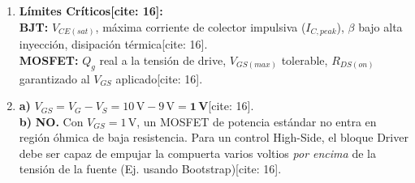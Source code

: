 \documentclass[11pt, a4paper]{article}
\begin{document}
\begin{enumerate}
    \item \textbf{Límites Críticos[cite: 16]:} \\
    \textbf{BJT:} $V_{CE(sat)}$, máxima corriente de colector impulsiva ($I_{C,peak}$), $\beta$ bajo alta inyección, disipación térmica[cite: 16]. \\
    \textbf{MOSFET:} $Q_g$ real a la tensión de drive, $V_{GS(max)}$ tolerable, $R_{DS(on)}$ garantizado al $V_{GS}$ aplicado[cite: 16].

    \item \textbf{a)} $V_{GS} = V_G - V_S = 10\,\text{V} - 9\,\text{V} = \mathbf{1\,\text{V}}$[cite: 16]. \\
    \textbf{b)} \textbf{NO.} Con $V_{GS} = 1\,\text{V}$, un MOSFET de potencia estándar no entra en región óhmica de baja resistencia. Para un control High-Side, el bloque Driver debe ser capaz de empujar la compuerta varios voltios \textit{por encima} de la tensión de la fuente (Ej. usando Bootstrap)[cite: 16].
\end{enumerate}
\end{document}
